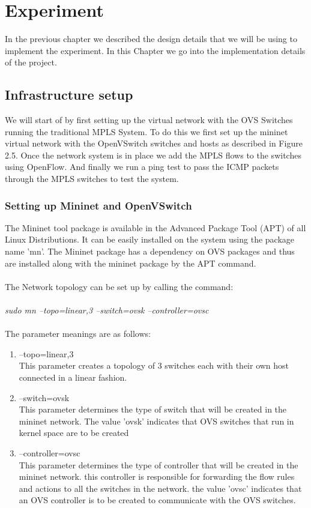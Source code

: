 \chapter{Experiment}
In the previous chapter we described the design details that we will be using to implement the experiment. In this Chapter we go into the implementation details of the project.

\section{Infrastructure setup}
We will start of by first setting up the virtual network with the OVS Switches running the traditional MPLS System. To do this we first set up the mininet virtual network with the OpenVSwitch switches and hosts as described in Figure 2.5. Once the network system is in place we add the MPLS flows to the switches using OpenFlow. And finally we run a ping test to pass the ICMP packets through the MPLS switches to test the system.

\subsection{Setting up Mininet and OpenVSwitch}
The Mininet tool package is available in the Advanced Package Tool (APT) of all Linux Distributions. It can be easily installed on the system using the package name 'mn'. The Mininet package has a dependency on OVS packages and thus are installed along with the mininet package by the APT command.\\
\\
The Network topology can be set up by calling the command:\\
\\
\textit{sudo mn --topo=linear,3 --switch=ovsk --controller=ovsc}\\
\\
The parameter meanings are as follows:
\begin{enumerate}
\item --topo=linear,3 \\
This parameter creates a topology of 3 switches each with their own host connected in a linear fashion.
\item --switch=ovsk \\
This parameter determines the type of switch that will be created in the mininet network. The value 'ovsk' indicates that OVS switches that run in kernel space are to be created
\item --controller=ovsc \\
This parameter determines the type of controller that will be created in the mininet network. this controller is responsible for forwarding the flow rules and actions to all the switches in the network. the value 'ovsc' indicates that an OVS controller is to be created to communicate with the OVS switches.
\end{enumerate}


